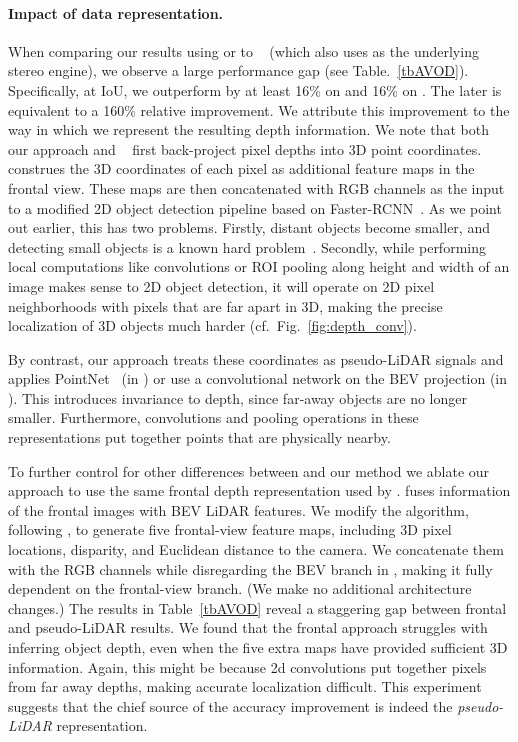 \paragraph{Impact of data representation.}
When comparing our results using \DispNetS or \DispNetC to \MLFstereo~\cite{xu2018multi} (which also uses \DispNet as the underlying stereo engine), we observe a large performance gap (see Table.~\ref{tbAVOD}). Specifically, at IoU,  we outperform \MLFstereo by at least 16\% on \APBEV and 16\% on \AP. The later is equivalent to a 160\% relative improvement. 
We attribute this improvement to the way in which we represent the resulting depth information. We note that both our approach and \MLFstereo~\cite{xu2018multi} first back-project pixel depths into 3D point coordinates. \MLFstereo construes the 3D coordinates of each pixel as additional feature maps in the frontal view. These maps are then concatenated with RGB channels as the input to a modified 2D object detection pipeline based on Faster-RCNN~\cite{ren2015faster}. As we point out earlier, this has two problems. Firstly, distant objects become smaller, and detecting small objects is a known hard problem~\cite{lin2017feature}.
Secondly, while performing local computations like convolutions or ROI pooling along height and width of an image makes sense to 2D object detection, it will operate on 2D pixel neighborhoods with pixels that are far apart in 3D, making the precise localization of 3D objects much harder (cf.~Fig.~\ref{fig:depth_conv}).

By contrast, our approach treats these coordinates as pseudo-LiDAR signals and applies PointNet~\cite{qi2017pointnet} (in \Frustum) or use a convolutional network on the BEV projection (in \AVOD).
This introduces invariance to depth, since far-away objects are no longer smaller.
Furthermore, convolutions and pooling operations in these representations put together points that are physically nearby.
 
To further control for other differences between \MLFstereo and our method we ablate our approach to use the same frontal depth representation used by \MLFstereo. 
\AVOD fuses information of the frontal images with BEV LiDAR features. We modify the algorithm, following \cite{chen20183d,xu2018multi}, to generate five frontal-view feature maps, including 3D pixel locations, disparity, and Euclidean distance to the camera. We concatenate them with the RGB channels while disregarding the BEV branch in \AVOD, making it fully dependent on the frontal-view branch. (We make no additional architecture changes.) The results in Table~\ref{tbAVOD} reveal a staggering gap between frontal and pseudo-LiDAR results. We found that the frontal approach  struggles with inferring object depth, even when the five extra maps have provided sufficient 3D information.
Again, this might be because 2d convolutions put together pixels from far away depths, making accurate localization difficult. This experiment suggests that the chief source of the accuracy improvement is indeed the \emph{pseudo-LiDAR} representation.

